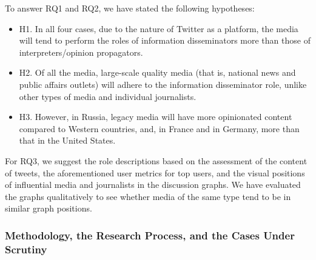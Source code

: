 To answer RQ1 and RQ2, we have stated the following hypotheses:
\begin{itemize}
	\item H1. In all four cases, due to the nature of Twitter as a platform, the media will tend to perform the roles of information disseminators more than those of interpreters/opinion propagators.
	\item H2. Of all the media, large-scale quality media (that is, national news and public affairs outlets) will adhere to the information disseminator role, unlike other types of media and individual journalists.
	\item H3. However, in Russia, legacy media will have more opinionated content compared to Western countries, and, in France and in Germany, more than that in the United States.
\end{itemize}

For RQ3, we suggest the role descriptions based on the assessment of the content of tweets, the aforementioned user metrics for top users, and the visual positions of influential media and journalists in the discussion graphs. We have evaluated the graphs qualitatively to see whether media of the same type tend to be in similar graph positions.

\subsubsection{Methodology, the Research Process, and the Cases Under Scrutiny}

